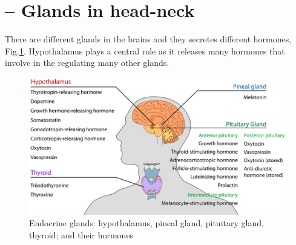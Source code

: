 \section{-- Glands in head-neck}
\label{sec:glands-head-neck}



There are different glands in the brains and they secretes different hormones,
Fig.\ref{fig:glands-and-their-hormones-in-head-neck}. Hypothalamus plays a
central role as it releases many hormones that involve in the regulating many
other glands.

\begin{figure}[htb]
  \centerline{\includegraphics[height=6cm]{./images/glands-and-their-hormones-in-head-neck.eps}}
  \caption{Endocrine glands:
  hypothalamus, pineal gland,
  pituitary gland, thyroid;
  and their hormones}\label{fig:glands-and-their-hormones-in-head-neck}
\end{figure}

